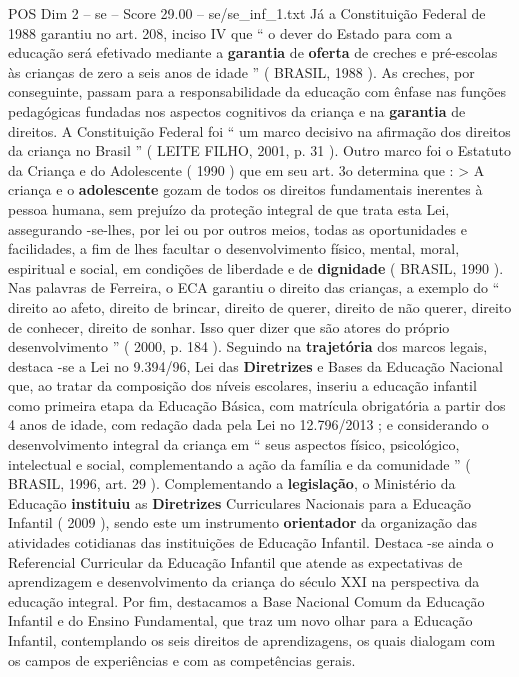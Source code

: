 \begin{textsample}{POS Dim 2 – se – Score 29.00 – se/se\_inf\_1.txt}
Já a Constituição Federal de 1988 garantiu no art. 208, inciso IV que “ o dever do Estado para com a educação será efetivado mediante a \textbf{garantia} de \textbf{oferta} de creches e pré-escolas às crianças de zero a seis anos de idade ” ( BRASIL, 1988 ).
As creches, por conseguinte, passam para a responsabilidade da educação com ênfase nas funções pedagógicas fundadas nos aspectos cognitivos da criança e na \textbf{garantia} de direitos.
A Constituição Federal foi “ um marco decisivo na afirmação dos direitos da criança no Brasil ” ( LEITE FILHO, 2001, p. 31 ).
Outro marco foi o Estatuto da Criança e do Adolescente ( 1990 ) que em seu art. 3o determina que : > A criança e o \textbf{adolescente} gozam de todos os direitos fundamentais inerentes à pessoa humana, sem prejuízo da proteção integral de que trata esta Lei, assegurando -se-lhes, por lei ou por outros meios, todas as oportunidades e facilidades, a fim de lhes facultar o desenvolvimento físico, mental, moral, espiritual e social, em condições de liberdade e de \textbf{dignidade} ( BRASIL, 1990 ).
Nas palavras de Ferreira, o ECA garantiu o direito das crianças, a exemplo do “ direito ao afeto, direito de brincar, direito de querer, direito de não querer, direito de conhecer, direito de sonhar.
Isso quer dizer que são atores do próprio desenvolvimento ” ( 2000, p. 184 ).
Seguindo na \textbf{trajetória} dos marcos legais, destaca -se a Lei no 9.394/96, Lei das \textbf{Diretrizes} e Bases da Educação Nacional que, ao tratar da composição dos níveis escolares, inseriu a educação infantil como primeira etapa da Educação Básica, com matrícula obrigatória a partir dos 4 anos de idade, com redação dada pela Lei no 12.796/2013 ; e considerando o desenvolvimento integral da criança em “ seus aspectos físico, psicológico, intelectual e social, complementando a ação da família e da comunidade ” ( BRASIL, 1996, art. 29 ).
Complementando a \textbf{legislação}, o Ministério da Educação \textbf{instituiu} as \textbf{Diretrizes} Curriculares Nacionais para a Educação Infantil ( 2009 ), sendo este um instrumento \textbf{orientador} da organização das atividades cotidianas das instituições de Educação Infantil.
Destaca -se ainda o Referencial Curricular da Educação Infantil que atende as expectativas de aprendizagem e desenvolvimento da criança do século XXI na perspectiva da educação integral.
Por fim, destacamos a Base Nacional Comum da Educação Infantil e do Ensino Fundamental, que traz um novo olhar para a Educação Infantil, contemplando os seis direitos de aprendizagens, os quais dialogam com os campos de experiências e com as competências gerais.

\end{textsample}

